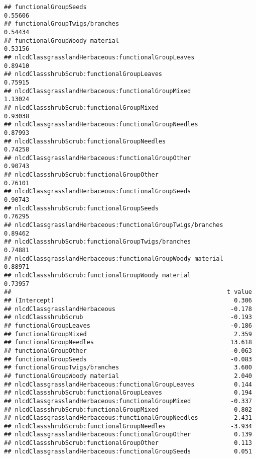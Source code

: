 \documentclass[]{article}
\begin{document}
\begin{verbatim}
## functionalGroupSeeds                                          0.55606
## functionalGroupTwigs/branches                                 0.54434
## functionalGroupWoody material                                 0.53156
## nlcdClassgrasslandHerbaceous:functionalGroupLeaves            0.89410
## nlcdClassshrubScrub:functionalGroupLeaves                     0.75915
## nlcdClassgrasslandHerbaceous:functionalGroupMixed             1.13024
## nlcdClassshrubScrub:functionalGroupMixed                      0.93038
## nlcdClassgrasslandHerbaceous:functionalGroupNeedles           0.87993
## nlcdClassshrubScrub:functionalGroupNeedles                    0.74258
## nlcdClassgrasslandHerbaceous:functionalGroupOther             0.90743
## nlcdClassshrubScrub:functionalGroupOther                      0.76101
## nlcdClassgrasslandHerbaceous:functionalGroupSeeds             0.90743
## nlcdClassshrubScrub:functionalGroupSeeds                      0.76295
## nlcdClassgrasslandHerbaceous:functionalGroupTwigs/branches    0.89462
## nlcdClassshrubScrub:functionalGroupTwigs/branches             0.74881
## nlcdClassgrasslandHerbaceous:functionalGroupWoody material    0.88971
## nlcdClassshrubScrub:functionalGroupWoody material             0.73957
##                                                            t value
## (Intercept)                                                  0.306
## nlcdClassgrasslandHerbaceous                                -0.178
## nlcdClassshrubScrub                                         -0.193
## functionalGroupLeaves                                       -0.186
## functionalGroupMixed                                         2.359
## functionalGroupNeedles                                      13.618
## functionalGroupOther                                        -0.063
## functionalGroupSeeds                                        -0.083
## functionalGroupTwigs/branches                                3.600
## functionalGroupWoody material                                2.040
## nlcdClassgrasslandHerbaceous:functionalGroupLeaves           0.144
## nlcdClassshrubScrub:functionalGroupLeaves                    0.194
## nlcdClassgrasslandHerbaceous:functionalGroupMixed           -0.337
## nlcdClassshrubScrub:functionalGroupMixed                     0.802
## nlcdClassgrasslandHerbaceous:functionalGroupNeedles         -2.431
## nlcdClassshrubScrub:functionalGroupNeedles                  -3.934
## nlcdClassgrasslandHerbaceous:functionalGroupOther            0.139
## nlcdClassshrubScrub:functionalGroupOther                     0.113
## nlcdClassgrasslandHerbaceous:functionalGroupSeeds            0.051

\end{verbatim}
\end{document}
